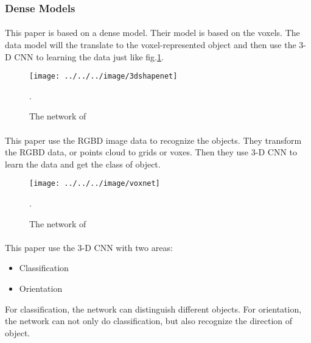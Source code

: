 \documentclass[border=0.5in]{blog}
\begin{document}
    \subsubsection{Dense Models}
    \label{sec:rbm:3d-cnn:dm}
    
    \paragraph{\citep{DBLP:journals/corr/WuSKTX14}}
    
    This paper is based on a dense model. Their model is based on the voxels.
    The data model will the translate to the voxel-represented object and then
    use the 3-D CNN to learning the data just like fig.\ref{fig:3d-shape-net}.
    
    \begin{figure}
        \centering
        \texttt{[image: ../../../image/3dshapenet]}
        \caption{The network of \citep{DBLP:journals/corr/WuSKTX14}}.
        \label{fig:3d-shape-net}
    \end{figure}


    \paragraph{\citep{maturana_iros_2015}}
    
    This paper use the RGBD image data to recognize the objects.
    They transform the RGBD data, or points cloud to grids or voxes.
    Then they use 3-D CNN to learn the data and get the class of object.
    
    \begin{figure}
        \centering
        \texttt{[image: ../../../image/voxnet]}
        \caption{The network of \citep{maturana_iros_2015}}.
        \label{fig:voxnet}
    \end{figure}
    
    \paragraph{\citep{DBLP:journals/corr/AlvarZB16}}
    
    This paper use the 3-D CNN with two areas:
    \begin{itemize}
        \item Classification
        \item Orientation
    \end{itemize}
    For classification, the network can distinguish different objects.
    For orientation, the network can not only do classification, but also recognize
    the direction of object.
    
\end{document}
